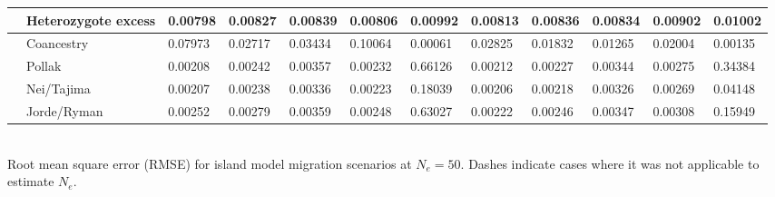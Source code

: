\begin{landscape}
\begin{table}[h]
\begin{tabular}{ | l | p{2cm}|| l | l | l | l | l || l | l | l | l | l | }
 		& Heterozygote excess & 0.00798 & 0.00827 & 0.00839 & 0.00806 & 0.00992 & 0.00813 & 0.00836 & 0.00834 & 0.00902 & 0.01002	\\ \hline
 		& Coancestry & 0.07973 & 0.02717 & 0.03434 & 0.10064 & 0.00061 & 0.02825 & 0.01832 & 0.01265 & 0.02004 & 0.00135	\\ \hline
 		& Pollak & 0.00208 & 0.00242 & 0.00357 & 0.00232 & 0.66126 & 0.00212 & 0.00227 & 0.00344 & 0.00275 & 0.34384	\\ \hline
		& Nei/Tajima & 0.00207 & 0.00238 & 0.00336 & 0.00223 & 0.18039 & 0.00206 & 0.00218 & 0.00326 & 0.00269 & 0.04148	\\ \hline
 		& Jorde/Ryman & 0.00252 & 0.00279 & 0.00359 & 0.00248 & 0.63027 & 0.00222 & 0.00246 & 0.00347 & 0.00308 & 0.15949	\\ \hline 
\end{tabular}
\bigskip{}
{\footnotesize  \\ Root mean square error (RMSE) for island model migration scenarios at $N_e = 50$. Dashes indicate cases where it was not applicable to estimate $N_e$.}
\end{table}



\end{landscape}

